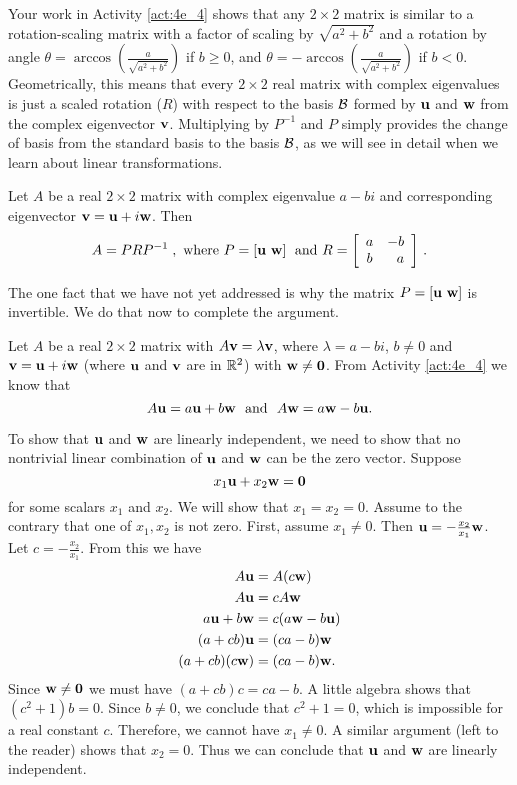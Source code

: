 Your work in Activity \ref{act:4e_4} shows that any $2\times 2$ matrix is similar to a rotation-scaling matrix with a factor of scaling by $\sqrt{a^2+b^2}$ and a rotation by angle $\theta=\arccos(\frac{a}{\sqrt{a^2+b^2}})$ if $b\geq 0$, and $\theta=-\arccos(\frac{a}{\sqrt{a^2+b^2}})$ if $b<0$. Geometrically, this means that every $2 \times 2$ real matrix with complex eigenvalues is just a scaled rotation ($R$) with respect to the basis $\mathcal{B}$ formed by $\mathbf{u}$ and $\mathbf{w}$ from the complex eigenvector $\mathbf{v}$. Multiplying by $P^{-1}$ and $P$ simply provides the change of basis from the standard basis to the basis $\mathcal{B}$, as we will see in detail when we learn about linear transformations.



\begin{theorem} Let $A$ be a real $2\times 2$ matrix with complex eigenvalue $a-bi$ and corresponding eigenvector $\mathbf{v}=\mathbf{u}+i\mathbf{w}$. Then 
\[ A=PRP^{-1} \; , \text{ where } P=[ \mathbf{u} \ \mathbf{w} ] \; \text{ and } R= \left[ \begin{array}{cr} a&-b \\ b&a \end{array} \right] \, .\]
\end{theorem}



The one fact that we have not yet addressed is why the matrix $P = [ \mathbf{u} \ \mathbf{w} ]$ is invertible. We do that now to complete the argument.

Let $A$ be a real $2 \times 2$ matrix with $A \mathbf{v} = \lambda \mathbf{v}$, where $\lambda = a-bi$, $b \neq 0$ and $\mathbf{v}=\mathbf{u}+i\mathbf{w}$ (where $\mathbf{u}$ and $\mathbf{v}$ are in $\mathbb{R}^2$) with $\mathbf{w} \neq \mathbf{0}$. From Activity \ref{act:4e_4} we know that 
\[A\mathbf{u} = a\mathbf{u} + b\mathbf{w} \ \text{ and } \ A\mathbf{w} = a\mathbf{w} - b \mathbf{u}.\]

To show that $\mathbf{u}$ and $\mathbf{w}$ are linearly independent, we need to show that no nontrivial linear combination of $\mathbf{u}$ and $\mathbf{w}$ can be the zero vector. Suppose
\[x_1\mathbf{u} + x_2\mathbf{w} = \mathbf{0}\]
for some scalars $x_1$ and $x_2$. We will show that $x_1 = x_2 = 0$. Assume to the contrary that one of $x_1, x_2$ is not zero. First, assume $x_1 \neq 0$. Then $\mathbf{u} = -\frac{x_2}{x_1} \mathbf{w}$. Let $c = -\frac{x_2}{x_1}$. From this we have
\begin{align*}
A \mathbf{u} &= A(c\mathbf{w}) \\
A \mathbf{u} &= cA \mathbf{w} \\
a\mathbf{u} + b\mathbf{w} &= c(a \mathbf{w} - b \mathbf{u}) \\
(a+cb)\mathbf{u} &= (ca-b)\mathbf{w} \\
(a+cb)(c\mathbf{w}) &= (ca-b)\mathbf{w}.
\end{align*}
Since $\mathbf{w} \neq \mathbf{0}$ we must have $(a+cb)c = ca-b$. A little algebra shows that $(c^2+1)b = 0$. Since $b \neq 0$, we conclude that $c^2+1=0$, which is impossible for a real constant $c$. Therefore, we cannot have $x_1 \neq 0$. A similar argument (left to the reader) shows that $x_2 = 0$. Thus we can conclude that $\mathbf{u}$ and $\mathbf{w}$ are linearly independent.

